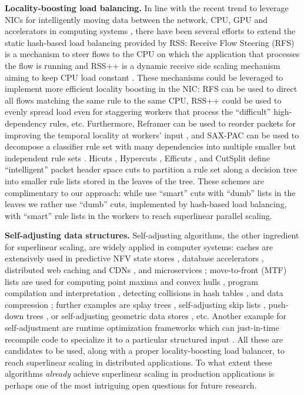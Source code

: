 \noindent%
\textbf{Locality-boosting load balancing.} %
In line with the recent trend to leverage NICs for intelligently moving data between the network, CPU, GPU and accelerators in computing systems \cite{sherry-ccr23}, there have been several efforts to extend the static hash-based load balancing provided by RSS: Receive Flow Steering (RFS) is a mechanism to steer flows to the CPU on which the application that processes the flow is running \cite{rss-linux} and RSS++ is a dynamic receive side scaling mechanism aiming to keep CPU load constant \cite{10.1145/3359989.3365412}. These mechanisms could be leveraged to implement more efficient locality boosting in the NIC: RFS can be used to direct all flows matching the same rule to the same CPU, RSS++ could be used to evenly spread load even for staggering workers that process the ``difficult'' high-dependency rules, etc. Furthermore, Reframer can be used to reorder packets for improving the temporal locality at workers' input \cite{276946,246322}, and SAX-PAC can be used to decompose a classifier rule set with many dependencies into multiple smaller but independent rule sets \cite{10.1145/2619239.2626294}.  Hicuts \cite{820051}, Hypercuts \cite{10.1145/863955.863980}, Efficuts \cite{10.1145/1851182.1851208}, and CutSplit \cite{8485947} define ``intelligent'' packet header space cuts \cite{180587} to partition a rule set along a decision tree into smaller rule lists stored in the leaves of the tree. These schemes are complimentary to our approach: while \cite{820051, 10.1145/863955.863980, 10.1145/1851182.1851208, 8485947} use ``smart'' cuts with ``dumb'' lists in the leaves we rather use ``dumb'' cuts, implemented by hash-based load balancing, with ``smart'' rule lists in the workers to reach superlinear parallel scaling.

\noindent%
\textbf{Self-adjusting data structures.} %
Self-adjusting algorithms, the other ingredient for superlinear scaling, are widely applied in computer systems: caches are extensively used in predictive NFV state stores \cite{295537}, database accelerators \cite{10.5555/1012889.1012894, 180324, ghigoff2021bmc}, distributed web caching and CDNs \cite{295603}, and microservices \cite{295493}; move-to-front (MTF) lists are used for computing point maxima and convex hulls \cite{BentleyCL93}, program compilation and interpretation \cite{HesterH85}, detecting collisions in hash tables \cite{HesterH85}, and data compression \cite{BentleySTW86}; further examples are splay trees \cite{SleatorT85Splay}, self-adjusting skip lists \cite{BoseDL08}, push-down trees \cite{Avin0020}, or self-adjusting geometric data stores \cite{ParkM12}, etc. Another example for self-adjustment are runtime optimization frameworks which can just-in-time recompile code to specialize it to a particular structured input \cite{276946,246322,10.1145/3503222.3507769,procieee_2019}.  All these are candidates to be used, along with a proper locality-boosting load balancer, to reach superlinear scaling in distributed applications.  To what extent these algorithms \emph{already} achieve superlinear scaling in production applications is perhaps one of the most intriguing open questions for future research.
  
